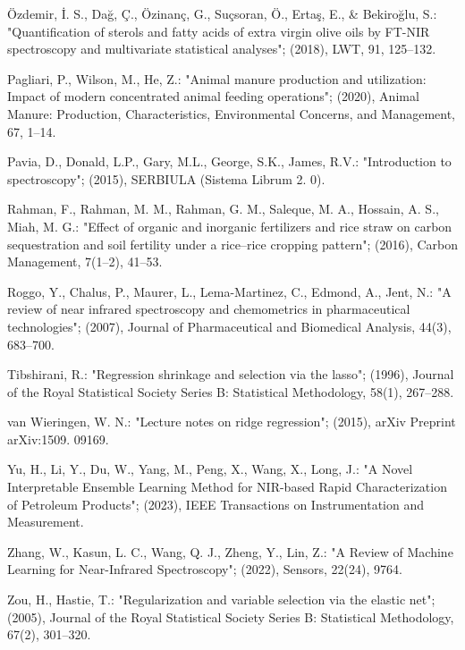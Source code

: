 \documentclass[10pt, a4paper, oneside]{article}
\begin{document}
\begin{thebibliography}{}
{Özdemir, İ. S., Dağ, Ç., Özinanç, G., Suçsoran, Ö., Ertaş, E., & Bekiroğlu, S.: "Quantification of sterols and fatty acids of extra virgin olive oils by FT-NIR spectroscopy and multivariate statistical analyses"; (2018), LWT, 91, 125–132.

 Pagliari, P., Wilson, M., He, Z.: "Animal manure production and utilization: Impact of modern concentrated animal feeding operations"; (2020), Animal Manure: Production, Characteristics, Environmental Concerns, and Management, 67, 1–14.

 Pavia, D., Donald, L.P., Gary, M.L., George, S.K., James, R.V.: "Introduction to spectroscopy"; (2015), SERBIULA (Sistema Librum 2. 0).

 Rahman, F., Rahman, M. M., Rahman, G. M., Saleque, M. A., Hossain, A. S., Miah, M. G.: "Effect of organic and inorganic fertilizers and rice straw on carbon sequestration and soil fertility under a rice--rice cropping pattern"; (2016), Carbon Management, 7(1–2), 41–53.

 Roggo, Y., Chalus, P., Maurer, L., Lema-Martinez, C., Edmond, A., Jent, N.: "A review of near infrared spectroscopy and chemometrics in pharmaceutical technologies"; (2007), Journal of Pharmaceutical and Biomedical Analysis, 44(3), 683–700.

Tibshirani, R.: "Regression shrinkage and selection via the lasso"; (1996), Journal of the Royal Statistical Society Series B: Statistical Methodology, 58(1), 267–288.

van Wieringen, W. N.: "Lecture notes on ridge regression"; (2015), arXiv Preprint arXiv:1509. 09169.

Yu, H., Li, Y., Du, W., Yang, M., Peng, X., Wang, X., Long, J.: "A Novel Interpretable Ensemble Learning Method for NIR-based Rapid Characterization of Petroleum Products"; (2023), IEEE Transactions on Instrumentation and Measurement.

 Zhang, W., Kasun, L. C., Wang, Q. J., Zheng, Y., Lin, Z.: "A Review of Machine Learning for Near-Infrared Spectroscopy"; (2022), Sensors, 22(24), 9764.

Zou, H., Hastie, T.: "Regularization and variable selection via the elastic net"; (2005), Journal of the Royal Statistical Society Series B: Statistical Methodology, 67(2), 301–320.
}
\end{thebibliography}
\end{document}
